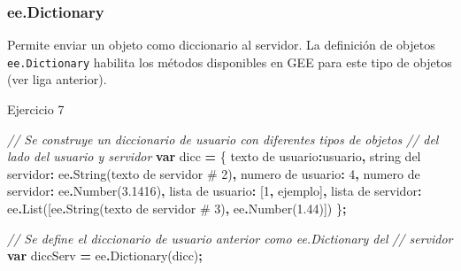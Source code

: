 \documentclass[
  12pt,
  letterpaper,
  twoside]{book}
\newenvironment{Shaded}{\begin{snugshade}}{\end{snugshade}}
\newcommand{\CommentTok}[1]{\textcolor[rgb]{0.56,0.35,0.01}{\textit{#1}}}
\newcommand{\DecValTok}[1]{\textcolor[rgb]{0.00,0.00,0.81}{#1}}
\newcommand{\FloatTok}[1]{\textcolor[rgb]{0.00,0.00,0.81}{#1}}
\newcommand{\FunctionTok}[1]{\textcolor[rgb]{0.00,0.00,0.00}{#1}}
\newcommand{\KeywordTok}[1]{\textcolor[rgb]{0.13,0.29,0.53}{\textbf{#1}}}
\newcommand{\NormalTok}[1]{#1}
\newcommand{\OperatorTok}[1]{\textcolor[rgb]{0.81,0.36,0.00}{\textbf{#1}}}
\newcommand{\StringTok}[1]{\textcolor[rgb]{0.31,0.60,0.02}{#1}}
\begin{document}
\hypertarget{ee.dictionary}{%
\subsubsection*{ee.Dictionary}\label{ee.dictionary}}

Permite enviar un objeto como diccionario al servidor. La definición de objetos \texttt{ee.Dictionary} habilita los métodos disponibles en GEE para este tipo de objetos (ver liga anterior).

Ejercicio 7

\begin{Shaded}
\begin{Highlighting}[]
\CommentTok{// Se construye un diccionario de usuario con diferentes tipos de objetos}
\CommentTok{// del lado del usuario y servidor}
\KeywordTok{var}\NormalTok{ dicc }\OperatorTok{=}\NormalTok{ \{                                                 }
  \StringTok{\textquotesingle{}texto de usuario\textquotesingle{}}\OperatorTok{:}\StringTok{\textquotesingle{}usuario\textquotesingle{}}\OperatorTok{,}
  \StringTok{\textquotesingle{}string del servidor\textquotesingle{}}\OperatorTok{:}\NormalTok{ ee}\OperatorTok{.}\FunctionTok{String}\NormalTok{(}\StringTok{\textquotesingle{}texto de servidor \# 2\textquotesingle{}}\NormalTok{)}\OperatorTok{,}
  \StringTok{\textquotesingle{}numero de usuario\textquotesingle{}}\OperatorTok{:} \DecValTok{4}\OperatorTok{,}
  \StringTok{\textquotesingle{}numero de servidor\textquotesingle{}}\OperatorTok{:}\NormalTok{ ee}\OperatorTok{.}\FunctionTok{Number}\NormalTok{(}\FloatTok{3.1416}\NormalTok{)}\OperatorTok{,}
  \StringTok{\textquotesingle{}lista de usuario\textquotesingle{}}\OperatorTok{:}\NormalTok{ [}\DecValTok{1}\OperatorTok{,} \StringTok{\textquotesingle{}ejemplo\textquotesingle{}}\NormalTok{]}\OperatorTok{,}
  \StringTok{\textquotesingle{}lista de servidor\textquotesingle{}}\OperatorTok{:}\NormalTok{ ee}\OperatorTok{.}\FunctionTok{List}\NormalTok{([ee}\OperatorTok{.}\FunctionTok{String}\NormalTok{(}\StringTok{\textquotesingle{}texto de servidor \# 3\textquotesingle{}}\NormalTok{)}\OperatorTok{,} 
\NormalTok{    ee}\OperatorTok{.}\FunctionTok{Number}\NormalTok{(}\FloatTok{1.44}\NormalTok{)])}
\NormalTok{\}}\OperatorTok{;} 

\CommentTok{// Se define el diccionario de usuario anterior como ee.Dictionary del }
\CommentTok{// servidor }
\KeywordTok{var}\NormalTok{ diccServ }\OperatorTok{=}\NormalTok{ ee}\OperatorTok{.}\FunctionTok{Dictionary}\NormalTok{(dicc)}\OperatorTok{;}     
\end{Highlighting}
\end{Shaded}
\end{document}
